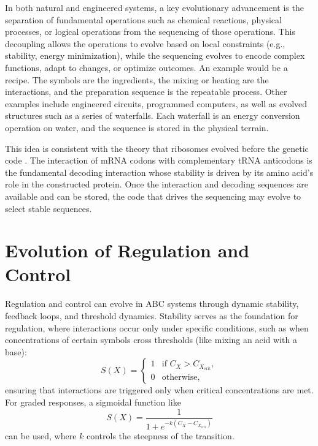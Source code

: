 \documentclass[entropy,article,submit,pdftex,moreauthors]{Definitions/mdpi}
\begin{document}
In both natural and engineered systems, a key evolutionary advancement is the separation of fundamental operations
such as chemical  reactions, physical processes, or logical operations from the sequencing of those operations. This decoupling allows the operations to evolve based on local constraints (e.g., stability, energy minimization), while the sequencing evolves to encode complex functions, adapt to changes, or optimize outcomes. An example would be a recipe. The symbols are the ingredients, the mixing or heating are the interactions, and the preparation sequence is the repeatable process. Other examples include engineered circuits, programmed computers, as well as evolved structures such as a series of waterfalls. Each waterfall is an energy conversion operation on water, and the sequence is stored in the physical terrain.

This idea is consistent with the theory that ribosomes evolved before the genetic code \cite{fox2010origin}. The interaction of mRNA codons with complementary tRNA anticodons is the fundamental decoding interaction whose stability is driven by its amino acid's role in the constructed protein. Once the interaction and decoding sequences are available and can be stored, the code that drives the sequencing may evolve to select stable sequences.

\section{Evolution of Regulation and Control}

Regulation and control can evolve in ABC systems through dynamic stability, feedback loops, and threshold dynamics. Stability serves as the foundation for regulation, where interactions occur only under specific conditions, such as when concentrations of certain symbols cross thresholds (like mixing an acid with a base): \[
S(X) = 
\begin{cases} 
1 & \text{if } C_X > C_{X_{\text{crit}}}, \\
0 & \text{otherwise,}
\end{cases}
\]
ensuring that interactions are triggered only when critical concentrations are met. For graded responses, a sigmoidal function like
\[
S(X) = \frac{1}{1 + e^{-k(C_X - C_{X_{\text{crit}}})}}
\]
can be used, where \(k\) controls the steepness of the transition.
\end{document}
